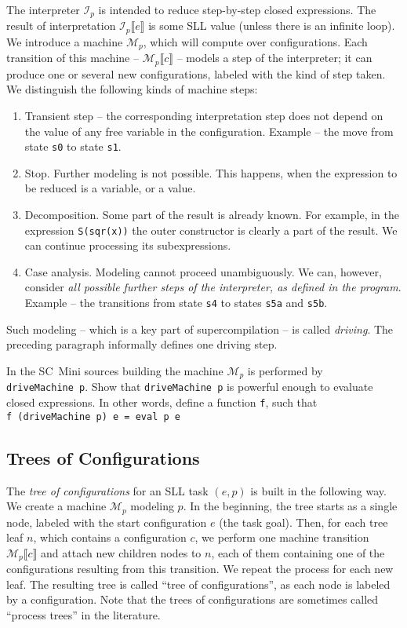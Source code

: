 The interpreter $\mathcal{I}_p$ is intended to reduce step-by-step closed expressions. 
The result of interpretation $\mathcal{I}_p\llbracket e \rrbracket$ is some SLL value (unless there is an infinite loop).
We introduce a machine $\mathcal{M}_p$, which will compute over configurations. 
Each transition of this machine -- $\mathcal{M}_p \llbracket c \rrbracket$ -- models a step of the interpreter;
it can produce one or several new configurations, labeled with the kind of step taken.
We distinguish the following kinds of machine steps:
\begin{enumerate}
  \item Transient step -- the corresponding interpretation step does not depend on
  the value of any free variable in the configuration.
  Example -- the move from state \texttt{s0} to state \texttt{s1}.
  \item Stop. Further modeling is not possible. 
  This happens, when the expression to be reduced is a variable, or a value.
  \item Decomposition. Some part of the result is already known.
  For example, in the expression \texttt{S(sqr(x))}
  the outer constructor is clearly a part of the result. 
  We can continue processing its subexpressions.
  \item Case analysis. Modeling cannot proceed unambiguously.
  We can, however, consider \emph{all possible further steps of the interpreter, as defined in the program}.
  Example -- the transitions from state \texttt{s4} to states \texttt{s5a} and \texttt{s5b}.
\end{enumerate}

Such modeling -- which is a key part of supercompilation -- is called \emph{driving}. 
The preceding paragraph informally defines one driving step.

\begin{exercise}
In the SC~Mini sources building the machine $\mathcal{M}_p$ is performed by \texttt{driveMachine~p}.
Show that \texttt{driveMachine~p} is powerful enough to evaluate closed expressions. 
In other words, define a function \texttt{f}, such that
\\ \texttt{f (driveMachine p) e = eval p e}
\end{exercise}

\subsection{Trees of Configurations}

The \emph{tree of configurations} for an SLL task $(e, p)$ is built in the following way.
We create a machine $\mathcal{M}_p$ modeling $p$.
In the beginning, the tree starts as a single node, labeled with the start configuration $e$ (the task goal).
Then, for each tree leaf $n$, which contains a configuration $c$, 
we perform one machine transition $\mathcal{M}_p \llbracket c \rrbracket$ and attach new children nodes to $n$,
each of them containing one of the configurations resulting from this transition.
We repeat the process for each new leaf. 
The resulting tree is called ``tree of configurations'', as each node is labeled by a configuration.
Note that the trees of configurations are sometimes called ``process trees'' in the literature.

